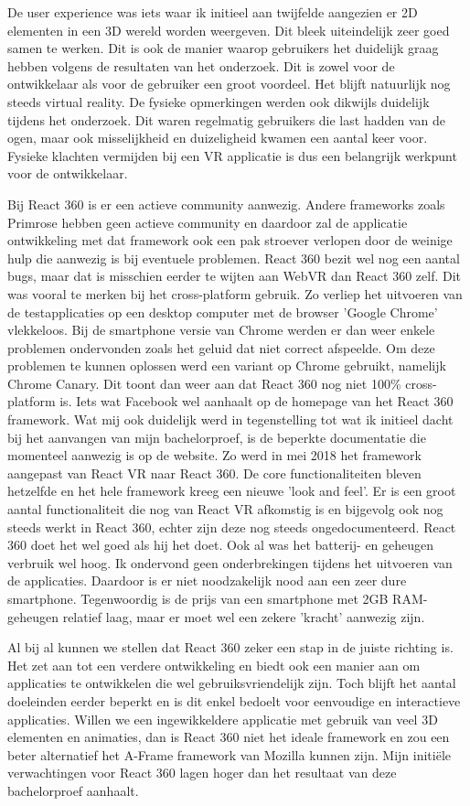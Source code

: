 De user experience was iets waar ik initieel aan twijfelde aangezien er 2D elementen in een 3D wereld worden weergeven. Dit bleek uiteindelijk zeer goed samen te werken. Dit is ook de manier waarop gebruikers het duidelijk graag hebben volgens de resultaten van het onderzoek. Dit is zowel voor de ontwikkelaar als voor de gebruiker een groot voordeel. Het blijft natuurlijk nog steeds virtual reality. De fysieke opmerkingen werden ook dikwijls duidelijk tijdens het onderzoek. Dit waren regelmatig gebruikers die last hadden van de ogen, maar ook misselijkheid en duizeligheid kwamen een aantal keer voor. Fysieke klachten vermijden bij een VR applicatie is dus een belangrijk werkpunt voor de ontwikkelaar.

Bij React 360 is er een actieve community aanwezig. Andere frameworks zoals Primrose hebben geen actieve community en daardoor zal de applicatie ontwikkeling met dat framework ook een pak stroever verlopen door de weinige hulp die aanwezig is bij eventuele problemen. React 360 bezit wel nog een aantal bugs, maar dat is misschien eerder te wijten aan WebVR dan React 360 zelf. Dit was vooral te merken bij het cross-platform gebruik. Zo verliep het uitvoeren van de testapplicaties op een desktop computer met de browser 'Google Chrome' vlekkeloos. Bij de smartphone versie van Chrome werden er dan weer enkele problemen ondervonden zoals het geluid dat niet correct afspeelde. Om deze problemen te kunnen oplossen werd een variant op Chrome gebruikt, namelijk Chrome Canary. Dit toont dan weer aan dat React 360 nog niet 100\% cross-platform is. Iets wat Facebook wel aanhaalt op de homepage van het React 360 framework. Wat mij ook duidelijk werd in tegenstelling tot wat ik initieel dacht bij het aanvangen van mijn bachelorproef, is de beperkte documentatie die momenteel aanwezig is op de website. Zo werd in mei 2018 het framework aangepast van React VR naar React 360. De core functionaliteiten bleven hetzelfde en het hele framework kreeg een nieuwe 'look and feel'. Er is een groot aantal functionaliteit die nog van React VR afkomstig is en bijgevolg ook nog steeds werkt in React 360, echter zijn deze nog steeds ongedocumenteerd. React 360 doet het wel goed als hij het doet. Ook al was het batterij- en geheugen verbruik wel hoog. Ik ondervond geen onderbrekingen tijdens het uitvoeren van de applicaties. Daardoor is er niet noodzakelijk nood aan een zeer dure smartphone. Tegenwoordig is de prijs van een smartphone met 2GB RAM-geheugen relatief laag, maar er moet wel een zekere 'kracht' aanwezig zijn.

Al bij al kunnen we stellen dat React 360 zeker een stap in de juiste richting is. Het zet aan tot een verdere ontwikkeling en biedt ook een manier aan om applicaties te ontwikkelen die wel gebruiksvriendelijk zijn. Toch blijft het aantal doeleinden eerder beperkt en is dit enkel bedoelt voor eenvoudige en interactieve applicaties. Willen we een ingewikkeldere applicatie met gebruik van veel 3D elementen en animaties, dan is React 360 niet het ideale framework en zou een beter alternatief het A-Frame framework van Mozilla kunnen zijn. Mijn initiële verwachtingen voor React 360 lagen hoger dan het resultaat van deze bachelorproef aanhaalt.